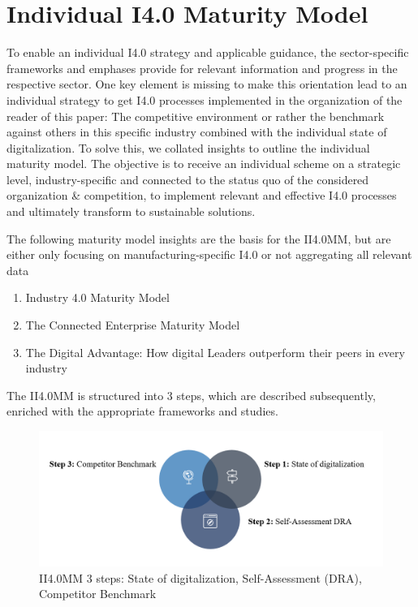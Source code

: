 \section{Individual I4.0 Maturity Model}

To enable an individual \ac{I4.0} strategy and applicable guidance, the sector-specific frameworks and emphases provide for relevant information and progress in the respective sector. One key element is missing to make this orientation lead to an individual strategy to get \ac{I4.0} processes implemented in the organization of the reader of this paper: The competitive environment or rather the benchmark against others in this specific industry combined with the individual state of digitalization. To solve this, we collated insights to outline the individual maturity model. The objective is to receive an individual scheme on a strategic level, industry-specific and connected to the status quo of the considered organization \& competition, to implement relevant and effective \ac{I4.0} processes and ultimately transform to sustainable solutions.

The following maturity model insights are the basis for the \ac{II4.0MM}, but are either only focusing on manufacturing-specific \ac{I4.0} or not aggregating all relevant data

\begin{enumerate}
\item Industry 4.0 Maturity Model \cite{Schumacher2016161}
\item The Connected Enterprise Maturity Model \cite{RockWellAutomation-connectedEnterpriseMaturityModel}
\item The Digital Advantage: How digital Leaders outperform their peers in every industry \cite{CapgeminiMaturityModelDigitalAdvantage}
\end{enumerate}

The \ac{II4.0MM} is structured into 3 steps, which are described subsequently, enriched with the appropriate frameworks and studies.


\begin{figure}[H]
\centering
\includegraphics[width=1\columnwidth]{images/II40MM_grafik.PNG}
\caption{\ac{II4.0MM} 3 steps: State of digitalization, Self-Assessment (DRA), Competitor Benchmark}
\end{figure}

